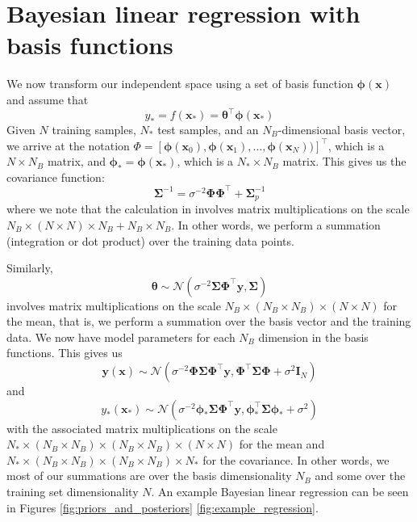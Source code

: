 \documentclass{article}
\begin{document}
\section{Bayesian linear regression with basis functions}

We now transform our independent space using a set of basis function $\boldsymbol{\phi}(\mathbf{x})$ and assume that
\begin{equation}
    y_\ast=f(\mathbf{x_\ast})=\boldsymbol{\theta}^\top\boldsymbol{\phi}(\mathbf{x_\ast})
\end{equation} 
Given $N$ training samples, $N_\ast$ test samples, and an $N_B$-dimensional basis vector, we arrive at the notation $\Phi=[\boldsymbol{\phi}(\mathbf{x}_0),\boldsymbol{\phi}(\mathbf{x}_1),\dots,\boldsymbol{\phi}(\mathbf{x}_{N}))]^\top$, which is a $N \times N_B$ matrix, and  $\boldsymbol{\phi}_\ast=\boldsymbol{\phi}(\mathbf{x}_\ast)$, which is a $N_\ast \times N_B$ matrix. This gives us the covariance function:
\begin{equation}
\label{covariance_matrix}
    \boldsymbol{\Sigma}^{-1} = \sigma^{-2} \boldsymbol{\Phi}  \boldsymbol{\Phi}^\top +  \boldsymbol{\Sigma}_p^{-1}
\end{equation} 
where we note that the calculation in involves matrix multiplications on the scale $N_B \times (N \times N) \times N_B + N_B \times N_B$. In other words, we perform a summation (integration or dot product) over the training data points.

Similarly,
\begin{equation}
\label{theta_distribution}
    \boldsymbol{\theta}\sim\mathcal{N}( \sigma^{-2}\boldsymbol{\Sigma} \boldsymbol{\Phi}^\top \mathbf{y},\boldsymbol{\Sigma})
\end{equation} 
involves matrix multiplications on the scale $N_B \times (N_B \times N_B) \times (N \times N)$ for the mean, that is, we perform a summation over the basis vector and the training data. We now have model parameters for each $N_B$ dimension in the basis functions. This gives us
\begin{equation}
\label{BLR_posterior}
    \mathbf{y}(\mathbf{x})\sim\mathcal{N}\left(\sigma^{-2}\boldsymbol{\Phi}  \boldsymbol{\Sigma} \boldsymbol{\Phi}^\top\mathbf{y} ,\boldsymbol{\Phi}^\top\boldsymbol{\Sigma}\boldsymbol{\Phi}+\sigma^2 \mathbf{I}_N\right)
\end{equation} 
and
\begin{equation}
\label{BLR_posterior}
    y_\ast(\mathbf{x}_\ast)\sim\mathcal{N}\left(\sigma^{-2}\boldsymbol{\phi}_\ast  \boldsymbol{\Sigma} \boldsymbol{\Phi}^\top\mathbf{y} ,\boldsymbol{\phi}^\top_\ast \boldsymbol{\Sigma}\boldsymbol{\phi}_\ast+ \sigma^2\right)
\end{equation} 
with the associated matrix multiplications on the scale $N_\ast \times(N_B \times N_B) \times (N_B \times N_B) \times (N \times N)$ for the mean and $N_\ast \times (N_B \times N_B) \times (N_B \times N_B) \times N_\ast$ for the covariance. In other words, we most of our summations are over the basis dimensionality $N_B$ and some over the training set dimensionality $N$. An example Bayesian linear regression can be seen in Figures  \ref{fig:priors_and_posteriors} \ref{fig:example_regression}.
\end{document}
